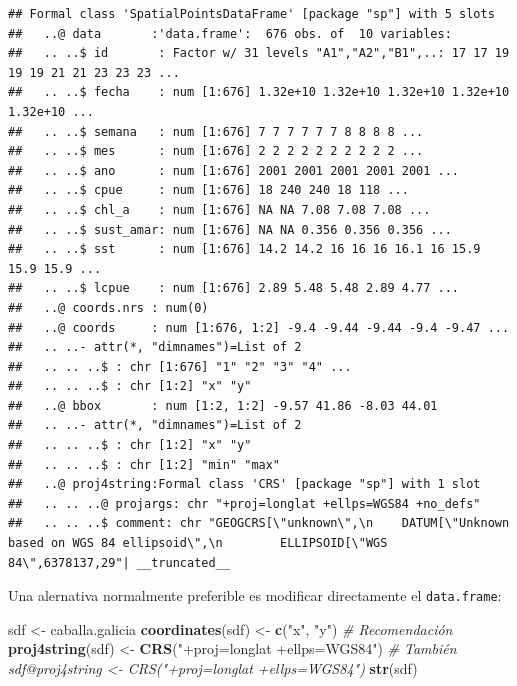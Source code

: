 \documentclass[
]{book}
\newenvironment{Shaded}{\begin{snugshade}}{\end{snugshade}}
\newcommand{\CommentTok}[1]{\textcolor[rgb]{0.56,0.35,0.01}{\textit{#1}}}
\newcommand{\FunctionTok}[1]{\textcolor[rgb]{0.13,0.29,0.53}{\textbf{#1}}}
\newcommand{\NormalTok}[1]{#1}
\newcommand{\OtherTok}[1]{\textcolor[rgb]{0.56,0.35,0.01}{#1}}
\newcommand{\StringTok}[1]{\textcolor[rgb]{0.31,0.60,0.02}{#1}}
\theoremstyle{break}
\theoremstyle{definition}
\theoremstyle{definition}
\theoremstyle{definition}
\theoremstyle{definition}
\theoremstyle{remark}
\begin{document}
\begin{verbatim}
## Formal class 'SpatialPointsDataFrame' [package "sp"] with 5 slots
##   ..@ data       :'data.frame':  676 obs. of  10 variables:
##   .. ..$ id       : Factor w/ 31 levels "A1","A2","B1",..: 17 17 19 19 19 21 21 23 23 23 ...
##   .. ..$ fecha    : num [1:676] 1.32e+10 1.32e+10 1.32e+10 1.32e+10 1.32e+10 ...
##   .. ..$ semana   : num [1:676] 7 7 7 7 7 7 8 8 8 8 ...
##   .. ..$ mes      : num [1:676] 2 2 2 2 2 2 2 2 2 2 ...
##   .. ..$ ano      : num [1:676] 2001 2001 2001 2001 2001 ...
##   .. ..$ cpue     : num [1:676] 18 240 240 18 118 ...
##   .. ..$ chl_a    : num [1:676] NA NA 7.08 7.08 7.08 ...
##   .. ..$ sust_amar: num [1:676] NA NA 0.356 0.356 0.356 ...
##   .. ..$ sst      : num [1:676] 14.2 14.2 16 16 16 16.1 16 15.9 15.9 15.9 ...
##   .. ..$ lcpue    : num [1:676] 2.89 5.48 5.48 2.89 4.77 ...
##   ..@ coords.nrs : num(0) 
##   ..@ coords     : num [1:676, 1:2] -9.4 -9.44 -9.44 -9.4 -9.47 ...
##   .. ..- attr(*, "dimnames")=List of 2
##   .. .. ..$ : chr [1:676] "1" "2" "3" "4" ...
##   .. .. ..$ : chr [1:2] "x" "y"
##   ..@ bbox       : num [1:2, 1:2] -9.57 41.86 -8.03 44.01
##   .. ..- attr(*, "dimnames")=List of 2
##   .. .. ..$ : chr [1:2] "x" "y"
##   .. .. ..$ : chr [1:2] "min" "max"
##   ..@ proj4string:Formal class 'CRS' [package "sp"] with 1 slot
##   .. .. ..@ projargs: chr "+proj=longlat +ellps=WGS84 +no_defs"
##   .. .. ..$ comment: chr "GEOGCRS[\"unknown\",\n    DATUM[\"Unknown based on WGS 84 ellipsoid\",\n        ELLIPSOID[\"WGS 84\",6378137,29"| __truncated__
\end{verbatim}

Una alernativa normalmente preferible es modificar directamente
el \texttt{data.frame}:

\begin{Shaded}
\begin{Highlighting}[]
\NormalTok{sdf }\OtherTok{\textless{}{-}}\NormalTok{ caballa.galicia}
\FunctionTok{coordinates}\NormalTok{(sdf) }\OtherTok{\textless{}{-}} \FunctionTok{c}\NormalTok{(}\StringTok{"x"}\NormalTok{, }\StringTok{"y"}\NormalTok{) }\CommentTok{\# Recomendación}
\FunctionTok{proj4string}\NormalTok{(sdf) }\OtherTok{\textless{}{-}} \FunctionTok{CRS}\NormalTok{(}\StringTok{"+proj=longlat +ellps=WGS84"}\NormalTok{)  }\CommentTok{\# También sdf@proj4string \textless{}{-} CRS("+proj=longlat +ellps=WGS84")}
\FunctionTok{str}\NormalTok{(sdf)}
\end{Highlighting}
\end{Shaded}
\end{document}
